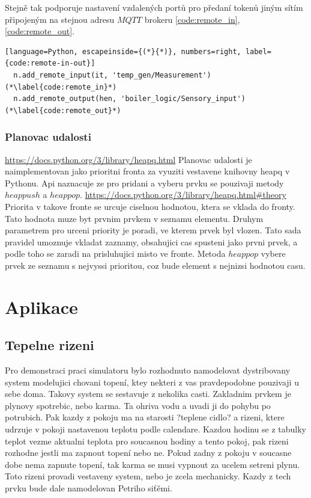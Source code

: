 Stejně tak podporuje nastavení vzdalených portů pro předaní tokenů jiným sítím připojeným na stejnou adresu $MQTT$ brokeru \ref{code:remote_in}, \ref{code:remote_out}.

\begin{lstlisting}[language=Python, escapeinside={(*}{*)}, numbers=right, label={code:remote-in-out}]
  n.add_remote_input(it, 'temp_gen/Measurement') (*\label{code:remote_in}*)
  n.add_remote_output(hen, 'boiler_logic/Sensory_input') (*\label{code:remote_out}*)
\end{lstlisting}


\subsection{Planovac udalosti}
\url{https://docs.python.org/3/library/heapq.html}
Planovac udalosti je naimplementovan jako prioritni fronta za vyuziti vestavene knihovny heapq v Pythonu. Api naznacuje ze pro pridani a vyberu prvku se pouzivaji metody $heappush$ a $heappop$. \url{https://docs.python.org/3/library/heapq.html#theory} Priorita v takove fronte se urcuje ciselnou hodnotou, ktera se vklada do fronty. Tato hodnota muze byt prvnim prvkem v seznamu elementu. Druhym parametrem pro urceni priority je poradi, ve kterem prvek byl vlozen. Tato sada pravidel umoznuje vkladat zaznamy, obsahujici cas spusteni jako prvni prvek, a podle toho se zaradi na prisluhujici misto ve fronte. Metoda $heappop$ vybere prvek ze seznamu s nejvyssi prioritou, coz bude element s nejnizsi hodnotou casu.
\chapter{Aplikace}
\section{Tepelne rizeni}
Pro demonstraci praci simulatoru bylo rozhodnuto namodelovat dystribovany system modelujici chovani topení, ktey nekteri z vas pravdepodobne pouzivaji u sebe doma. Takovy system se sestavuje z nekolika casti. Zakladnim prvkem je plynovy spotrebic, nebo karma. Ta ohriva vodu a uvadi ji do pohybu po potrubich. Pak kazdy z pokoju ma na starosti ?teplene cidlo? a rizeni, ktere udrzuje v pokoji nastavenou teplotu podle calendare. Kazdou hodinu se z tabulky teplot vezme aktualni teplota pro soucasnou hodiny a tento pokoj, pak rizeni rozhodne jestli ma zapnout topení nebo ne. Pokud zadny z pokoju v soucasne dobe nema zapnute topení, tak karma se musi vypnout za ucelem setreni plynu. Toto rizeni provadi vestaveny system, nebo je zcela mechanicky. Kazdy z tech prvku bude dale namodelovan Petriho siťěmi.

